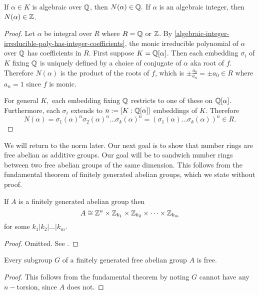 \begin{lemma}\label{norm-of-alg-int-is-integer}
If $\alpha\in K$ is algebraic over $\mathbb{Q}$, then $N(\alpha)\in \mathbb{Q}.$ If $\alpha$ is an algebraic integer, then $N(\alpha)\in \mathbb{Z}$.
\end{lemma}
\begin{proof}
Let $\alpha$ be integral over $R$ where $R=\mathbb{Q}$ or $\mathbb{Z}$. By \cref{algebraic-integer-irreducible-poly-has-integer-coefficients}, the monic irreducible polynomial of $\alpha$ over $\mathbb{Q}$ has coefficients in $R$. First suppose $K=\mathbb{Q}[\alpha]$. Then each embedding $\sigma_i$ of $K$ fixing $\mathbb{Q}$ is uniquely defined by a choice of conjugate of $\alpha$ aka root of $f$. Therefore $N(\alpha)$ is the product of the roots of $f$, which is $\pm\frac{a_0}{a_n}=\pm a_0\in R$ where $a_n=1$ since $f$ is monic.

For general $K,$ each embedding fixing $\mathbb{Q}$ restricts to one of these on $\mathbb{Q}[\alpha]$. Furthermore, each $\sigma_i$ extends to $n:=[K:\mathbb{Q}[\alpha]]$ embeddings of $K$. Therefore 
$$N(\alpha)=\sigma_1(\alpha)^n\sigma_2(\alpha)^n\dots\sigma_k(\alpha)^n=(\sigma_1(\alpha)\dots\sigma_k(\alpha))^n\in R.$$
\end{proof}


We will return to the norm later. Our next goal is to show that number rings are free abelian as additive groups. Our goal will be to sandwich number rings between two free abelian groups of the same dimension. This follows from the fundamental theorem of finitely generated abelian groups, which we state without proof.

\begin{theorem}
If $A$ is a finitely generated abelian group then
$$A\cong \mathbb{Z}^n\times\mathbb{Z}_{k_1}\times \mathbb{Z}_{k_2}\times \dots \times \mathbb{Z}_{k_m}$$
for some $k_1|k_2|\dots|k_m$.
\end{theorem}
\begin{proof}
Omitted. See \cite{GroupTheory}.
\end{proof}

\begin{corollary}
Every subgroup $G$ of a finitely generated free abelian group $A$ is free.
\end{corollary}
\begin{proof}
This follows from the fundamental theorem by noting $G$ cannot have any $n-$torsion, since $A$ does not.
\end{proof}


